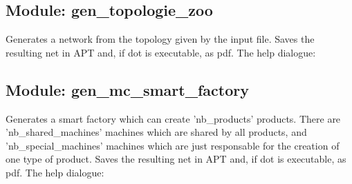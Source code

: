 \subsection*{Module: gen\_topologie\_zoo}
Generates a network from the topology given by the input file. Saves the resulting net in APT and, if dot is executable, as pdf. The help dialogue: 

\subsection*{Module: gen\_mc\_smart\_factory}
Generates a smart factory which can create 'nb\_products' products. There
 are 'nb\_shared\_machines' machines which are shared by all products, and
'nb\_special\_machines' machines which are just responsable for the
 creation of one type of product. Saves the resulting net in APT and, if dot is executable, as pdf. The help dialogue: 

